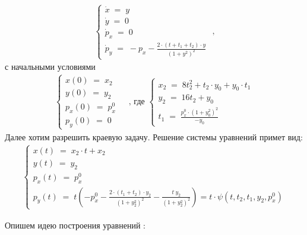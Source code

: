 \documentclass[a4paper,12pt]{article}
\begin{document}
\begin{align*}
    \left\{
        \begin{array}{l}
            \dot x\;=\; y \\
            \dot y \;=\;0 \\
            \dot p_x \;=\;0\\
            \dot p_y \;=\; -p_x - \frac{2\cdot (t+t_1+t_2)\cdot y}{(1+y^2)^2}
        \end{array}
    \right.
    \text{  ,}
\end{align*}
с начальными условиями 
\begin{align*}
    \left\{
        \begin{array}{l}
            x(0)\;=\; x_2 \\
            y(0) \;=\; y_2 \\
            p_x(0) \;=\; p_x^0\\
            p_y(0) \;=\; 0
        \end{array}
    \right.
    \;\;\; \text{ , где }
    \left\{
        \begin{array}{l}
            x_2\;=\; 8 t_2^2 + t_2\cdot y_0 + y_0 \cdot t_1 \\
            y_2 \;=\; 16 t_2 + y_0 \\
            t_1 \;=\; \frac{p_x^0 \cdot (1+y_0^2)^2}{- y_0 }
        \end{array}
    \right.
\end{align*}
Далее хотим разрешить краевую задачу.  Решение системы уравнений примет вид:
\begin{align*}
    \left\{
        \begin{array}{l}
            x(t)\;=\; x_2\cdot t +x_2 \\
            y(t) \;=\; y_2 \\
            p_x(t) \;=\; p_x^0\\
            p_y(t) \;=\; t\left( -p_x^0 - \frac{2\cdot (t_1 + t_2)\cdot y_2}{(1+y_2^2)^2}-\frac{t^\cdot y_2}{(1+y_2^2)^2} \right)=t\cdot \psi(t,t_2,t_1,y_2,p_x^0)
        \end{array}
    \right.
\end{align*}

Опишем идею построения уравнений :
\end{document}
